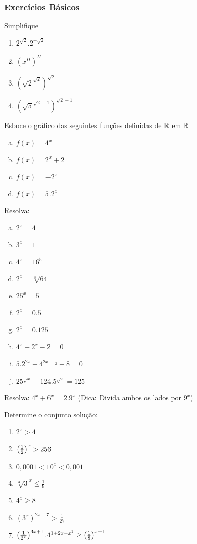 \subsubsection{Exercícios Básicos}
\begin{exer} Simplifique
\end{exer}
\begin{enumerate}
\item $2^{\sqrt{2}}.2^{-\sqrt{2}}$
\item $(x^{\Pi})^{\Pi}$
\item $(\sqrt{2}^{\sqrt{2}})^{\sqrt{2}}$
\item $(\sqrt{5}^{\sqrt{2}-1})^{\sqrt{2}+1}$
\end{enumerate}
\begin{exer} Esboce o gráfico das seguintes funções definidas de $\mathbb{R}$ em $\mathbb{R}$
\end{exer}
\begin{enumerate}[a)]
\item $f(x) = 4^x$
\item $f(x) = 2^x+2$
\item $f(x) = - 2^x$
\item $f(x) = 5.2^x$
\end{enumerate}
\begin{exer} Resolva:
\begin{enumerate}[a)]
\item $2^x = 4$
\item $3^x = 1$
\item $4^x = 16^5$
\item $2^x = \sqrt[8]{64}$
\item $25^x = 5$
\item $2^x=0.5$
\item $2^x=0.125$
\item $4^x-2^x-2=0$
\item $5.2^{2x} - 4^{2x-\frac{1}{2}}-8=0$
\item $25^{\sqrt{x}} - 124.5^{\sqrt{x}} = 125$
\end{enumerate}
\end{exer}
\begin{exer} Resolva: $4^x + 6^x = 2.9^x$ (Dica: Divida ambos os lados por $9^x$)
\end{exer}
\begin{exer} Determine o conjunto solução:
\begin{enumerate}
\item $2^x>4$
\item $\left ( \frac{1}{2} \right)^x>256$
\item $0,0001 < 10^x < 0,001$
\item $\sqrt[3]{3}^x \leq \frac{1}{9}$
\item $4^x \geq 8$
\item $(3^x)^{2x-7}>\frac{1}{27}$
\item $\left ( \frac{1}{2^x} \right)^{3x+1}.4^{1+2x-x^2}\geq \left ( \frac{1}{8} \right)^{x-1}$
\end{enumerate}
\end{exer}
